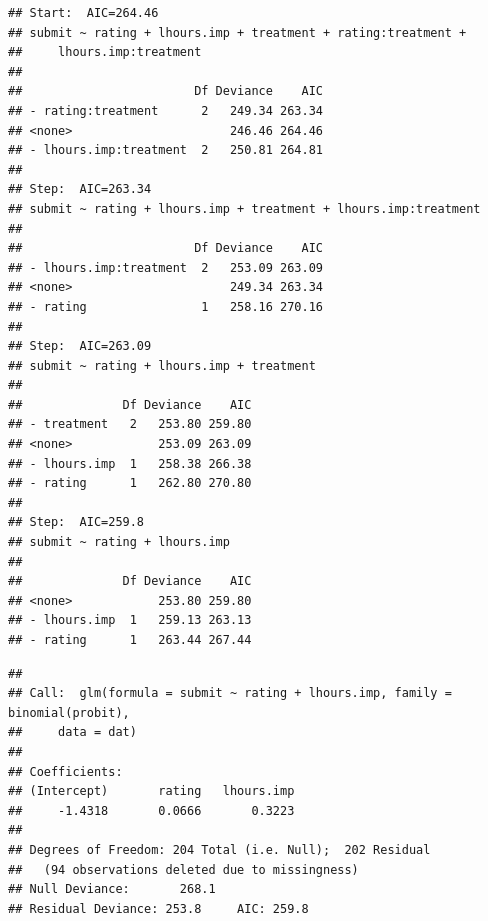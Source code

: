 \documentclass[]{article}
\begin{document}
\begin{verbatim}
## Start:  AIC=264.46
## submit ~ rating + lhours.imp + treatment + rating:treatment + 
##     lhours.imp:treatment
## 
##                        Df Deviance    AIC
## - rating:treatment      2   249.34 263.34
## <none>                      246.46 264.46
## - lhours.imp:treatment  2   250.81 264.81
## 
## Step:  AIC=263.34
## submit ~ rating + lhours.imp + treatment + lhours.imp:treatment
## 
##                        Df Deviance    AIC
## - lhours.imp:treatment  2   253.09 263.09
## <none>                      249.34 263.34
## - rating                1   258.16 270.16
## 
## Step:  AIC=263.09
## submit ~ rating + lhours.imp + treatment
## 
##              Df Deviance    AIC
## - treatment   2   253.80 259.80
## <none>            253.09 263.09
## - lhours.imp  1   258.38 266.38
## - rating      1   262.80 270.80
## 
## Step:  AIC=259.8
## submit ~ rating + lhours.imp
## 
##              Df Deviance    AIC
## <none>            253.80 259.80
## - lhours.imp  1   259.13 263.13
## - rating      1   263.44 267.44
\end{verbatim}

\begin{verbatim}
## 
## Call:  glm(formula = submit ~ rating + lhours.imp, family = binomial(probit), 
##     data = dat)
## 
## Coefficients:
## (Intercept)       rating   lhours.imp  
##     -1.4318       0.0666       0.3223  
## 
## Degrees of Freedom: 204 Total (i.e. Null);  202 Residual
##   (94 observations deleted due to missingness)
## Null Deviance:       268.1 
## Residual Deviance: 253.8     AIC: 259.8
\end{verbatim}
\end{document}

